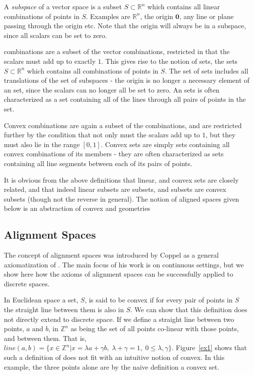 \documentclass[11pt,a4paper]{llncs}
\newcounter{ax}
\newcommand\Z[1][]{\ensuremath{\mathbb{Z}^{#1}}\xspace}
\newcommand\R[1][]{\ensuremath{\mathbb{R}^{#1}}\xspace}
\begin{document}
A \emph{subspace} of a vector space is a subset $S \subset\R[n]$ which contains all linear combinations of points in $S$. Examples are $\R[n]$, the origin $\mathbf{0}$, any line or  plane passing through the origin etc. Note that the origin will always be in a subspace, since all scalars can be set to zero.

 combinations are a subset of the vector combinations, restricted in that the scalars must add up to exactly $1$. This gives rise to the notion of  sets, the sets $S \subset\R[n]$ which contains all  combinations of points in $S$. The set of  sets includes all translations of the set of subspaces - the origin is no longer a necessary element of an  set, since the scalars can no longer all be set to zero. An  sets is often characterized as a set containing all of the lines through all pairs of points in the set.

Convex combinations are again a subset of the  combinations, and are restricted further by the condition that not only must the scalars add up to $1$, but they must also lie in the range $[0,1]$. Convex sets are simply sets containing all convex combinations of its members - they are often characterized as sets containing all line segments between each of its pairs of points.

It is obvious from the above definitions that linear,  and convex sets are closely related, and that indeed linear subsets are  subsets, and  subsets are convex subsets (though not the reverse in general). The notion of aligned spaces given below is an abstraction of convex and  geometries


\subsection{Alignment Spaces}\label{align}%

The concept of alignment spaces was introduced by Coppel\cite{Coppel98} as a general axiomatization of . The main focus of his work is on continuous settings, but we show here how the axioms of alignment spaces can be successfully applied to discrete spaces.

In Euclidean space a set, $S$, is said to be convex if for every pair of points in $S$ the straight line between them is also in $S$. We can show  that this definition does not directly extend to discrete space. If we define a straight line between two points, $a$ and $b$, in \Z[n] as being the set of all points co-linear with those points, and between them. That is, $line(a,b) = \{x\in\Z[n]|x = \lambda a + \gamma b,\;\lambda + \gamma = 1,\;0\leq\lambda,\gamma\}$. Figure~\ref{ex1} shows that such a definition of  does not fit with an intuitive notion of convex. In this example, the three points alone are by the naive definition a convex set.
\end{document}
